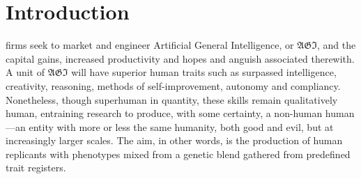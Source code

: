 


\section*{Introduction}

\lettrine[lines=3]{\junicode{\textcolor{violet}{AI}}}{} firms seek to market
and engineer Artificial General Intelligence, or $\mathfrak{AGI}$, and the
capital gains, increased productivity and hopes and anguish associated
therewith.  A unit of $\mathfrak{AGI}$ will have superior human traits such as
surpassed intelligence, creativity, reasoning, methods of self-improvement,
autonomy and compliancy. Nonetheless, though superhuman in quantity, these
skills remain qualitatively human, entraining research to produce, with some
certainty, a non-human human---an entity with more or less the same humanity,
both good and evil, but at increasingly larger scales. The aim, in other words,
is the production of human replicants with phenotypes mixed from a genetic
blend gathered from predefined trait registers.


